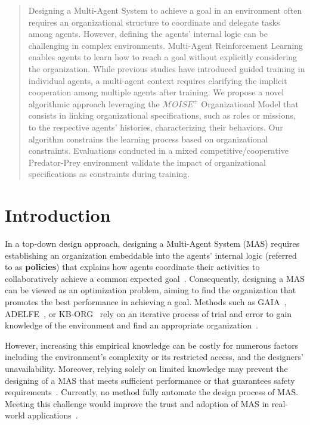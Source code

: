 \documentclass[runningheads]{llncs}
\theoremstyle{freethm}
\theoremstyle{proofoutline}
\begin{document}
\begin{abstract}

    Designing a Multi-Agent System to achieve a goal in an environment often requires an organizational structure to coordinate and delegate tasks among agents. However, defining the agents' internal logic can be challenging in complex environments. Multi-Agent Reinforcement Learning enables agents to learn how to reach a goal without explicitly considering the organization. While previous studies have introduced guided training in individual agents, a multi-agent context requires clarifying the implicit cooperation among multiple agents after training. We propose a novel algorithmic approach leveraging the $\mathcal{M}OISE^+$ Organizational Model that consists in linking organizational specifications, such as roles or missions, to the respective agents' histories, characterizing their behaviors. Our algorithm constrains the learning process based on organizational constraints. Evaluations conducted in a mixed competitive/cooperative Predator-Prey environment validate the impact of organizational specifications as constraints during training.

\end{abstract}


\section{Introduction}

In a top-down design approach, designing a Multi-Agent System (MAS) requires establishing an organization embeddable into the agents' internal logic (referred to as \textbf{policies}) that explains how agents coordinate their activities to collaboratively achieve a common expected goal~\cite{Picard2009}.
%
Consequently, designing a MAS can be viewed as an optimization problem, aiming to find the organization that promotes the best performance in achieving a goal. Methods such as GAIA~\cite{Wooldridge2000,Cernuzzi2014}, ADELFE~\cite{Mefteh2015}, or KB-ORG~\cite{Sims2008} rely on an iterative process of trial and error to gain knowledge of the environment and find an appropriate organization~\cite{Sims2008}.

However, increasing this empirical knowledge can be costly for numerous factors including the environment's complexity or its restricted access, and the designers' unavailability. Moreover, relying solely on limited knowledge may prevent the designing of a MAS that meets sufficient performance or that guarantees safety requirements~\cite{Mefteh2013}. Currently, no method fully automate the design process of MAS. Meeting this challenge would improve the trust and adoption of MAS in real-world applications~\cite{kok2006collaborative,omidshafiei2019learning}.
\end{document}

